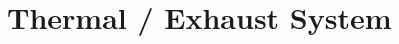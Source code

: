 \documentclass[../main]{subfiles}
\begin{document}
\chapter{Thermal / Exhaust System} \label{chp:}








\end{document}
